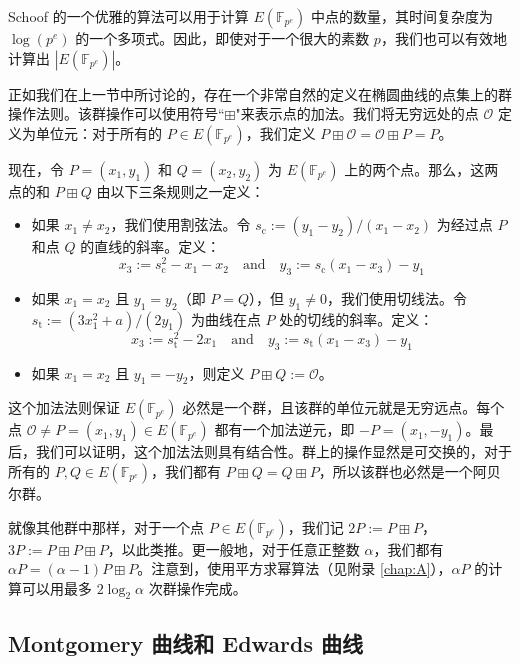 \begin{remark}\label{remark:15-1}
Schoof 的一个优雅的算法可以用于计算 $E(\mathbb{F}_{p^e})$ 中点的数量，其时间复杂度为 $\log(p^e)$ 的一个多项式。因此，即使对于一个很大的素数 $p$，我们也可以有效地计算出 $|E(\mathbb{F}_{p^e})|$。
\end{remark}

\begin{snote}[加法法则。]
正如我们在上一节中所讨论的，存在一个非常自然的定义在椭圆曲线的点集上的群操作法则。该群操作可以使用符号``$\boxplus$"来表示点的加法。我们将无穷远处的点 $\mathcal{O}$ 定义为单位元：对于所有的 $P\in E(\mathbb{F}_{p^e})$，我们定义 $P\boxplus\mathcal{O}=\mathcal{O} \boxplus P=P$。

现在，令 $P=(x_1, y_1)$ 和 $Q=(x_2,y_2)$ 为 $E(\mathbb{F}_{p^e})$ 上的两个点。那么，这两点的和 $P\boxplus Q$ 由以下三条规则之一定义：
\begin{itemize}
	\item 如果 $x_1 \neq x_2$，我们使用割弦法。令 $s_\mathrm{c}:=(y_1-y_2)/(x_1-x_2)$ 为经过点 $P$ 和点 $Q$ 的直线的斜率。定义：
		\[
			x_3:=s_\mathrm{c}^2-x_1-x_2
			\quad\text{and}\quad
			y_3:=s_\mathrm{c}(x_1-x_3)-y_1
		\]
	\item 如果 $x_1=x_2$ 且 $y_1=y_2$（即 $P=Q$），但 $y_1 \neq0$，我们使用切线法。令 $s_\mathrm{t}:=(3x_1^2+a)/(2y_1)$ 为曲线在点 $P$ 处的切线的斜率。定义：
		\[
			x_3:=s_\mathrm{t}^2-2x_1
			\quad\text{and}\quad
			y_3:=s_\mathrm{t}(x_1-x_3)-y_1
		\]
	\item 如果 $x_1=x_2$ 且 $y_1=-y_2$，则定义 $P\boxplus Q:=\mathcal{O}$。
\end{itemize}
这个加法法则保证 $E(\mathbb{F}_{p^e})$ 必然是一个群，且该群的单位元就是无穷远点。每个点 $\mathcal{O}\neq P=(x_1,y_1)\in E(\mathbb{F}_{p^e})$ 都有一个加法逆元，即 $-P=(x_1,-y_1)$。最后，我们可以证明，这个加法法则具有结合性。群上的操作显然是可交换的，对于所有的 $P,Q \in E(\mathbb{F}_{p^e})$，我们都有 $P\boxplus Q=Q\boxplus P$，所以该群也必然是一个阿贝尔群。

就像其他群中那样，对于一个点 $P\in E(\mathbb{F}_{p^e})$，我们记 $2P:=P\boxplus P$，$3P:=P\boxplus P\boxplus P$，以此类推。更一般地，对于任意正整数 $\alpha$，我们都有 $\alpha P = (\alpha - 1)P \boxplus P$。注意到，使用平方求幂算法（见附录 \ref{chap:A}），$\alpha P$ 的计算可以用最多 $2\log_2\alpha$ 次群操作完成。
\end{snote}

\subsection{Montgomery 曲线和 Edwards 曲线}

